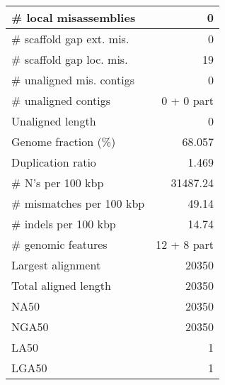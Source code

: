 \documentclass[12pt,a4paper]{article}
\begin{document}
\begin{table}[ht]
\begin{center}
\begin{tabular}{|l*{1}{|r}|}
\# local misassemblies & 0 \\ \hline
\# scaffold gap ext. mis. & 0 \\ \hline
\# scaffold gap loc. mis. & 19 \\ \hline
\# unaligned mis. contigs & 0 \\ \hline
\# unaligned contigs & 0 + 0 part \\ \hline
Unaligned length & 0 \\ \hline
Genome fraction (\%) & 68.057 \\ \hline
Duplication ratio & 1.469 \\ \hline
\# N's per 100 kbp & 31487.24 \\ \hline
\# mismatches per 100 kbp & 49.14 \\ \hline
\# indels per 100 kbp & 14.74 \\ \hline
\# genomic features & 12 + 8 part \\ \hline
Largest alignment & 20350 \\ \hline
Total aligned length & 20350 \\ \hline
NA50 & 20350 \\ \hline
NGA50 & 20350 \\ \hline
LA50 & 1 \\ \hline
LGA50 & 1 \\ \hline
\end{tabular}
\end{center}
\end{table}
\end{document}
